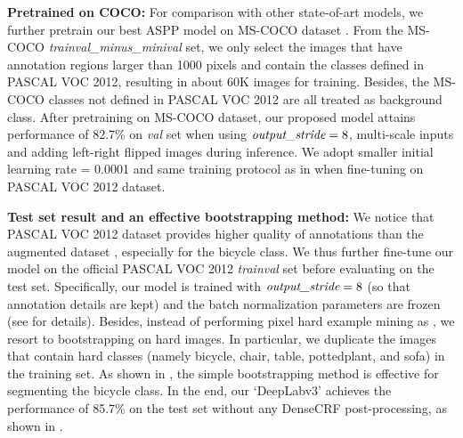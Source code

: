
\textbf{Pretrained on COCO:} For comparison with other state-of-art models, we further pretrain our best ASPP model on MS-COCO dataset \cite{lin2014microsoft}. From the MS-COCO \textit{trainval\_minus\_minival} set, we only select the images that have annotation regions larger than 1000 pixels and contain the classes defined in PASCAL VOC 2012, resulting in about 60K images for training. Besides, the MS-COCO classes not defined in PASCAL VOC 2012 are all treated as background class. After pretraining on MS-COCO dataset, our proposed model attains performance of 82.7\% on \textit{val} set when using $\emph{output\_stride}=8$, multi-scale inputs and adding left-right flipped images during inference. We adopt smaller initial learning rate = 0.0001 and same training protocol as in  when fine-tuning on PASCAL VOC 2012 dataset.


\textbf{Test set result and an effective bootstrapping method:} We notice that PASCAL VOC 2012 dataset provides higher quality of annotations than the augmented dataset \cite{hariharan2011semantic}, especially for the bicycle class. We thus further fine-tune our model on the official PASCAL VOC 2012 \textit{trainval} set before evaluating on the test set. Specifically, our model is trained with $\emph{output\_stride}=8$ (so that annotation details are kept) and the batch normalization parameters are frozen (see  for details).  Besides, instead of performing pixel hard example mining as \cite{wu2016bridging, pohlen2016full}, we resort to bootstrapping on hard images. In particular, we duplicate the images that contain hard classes (namely bicycle, chair, table, pottedplant, and sofa) in the training set. As shown in , the simple bootstrapping method is effective for segmenting the bicycle class. In the end, our `DeepLabv3' achieves the performance of 85.7\% on the test set without any DenseCRF post-processing, as shown in .

